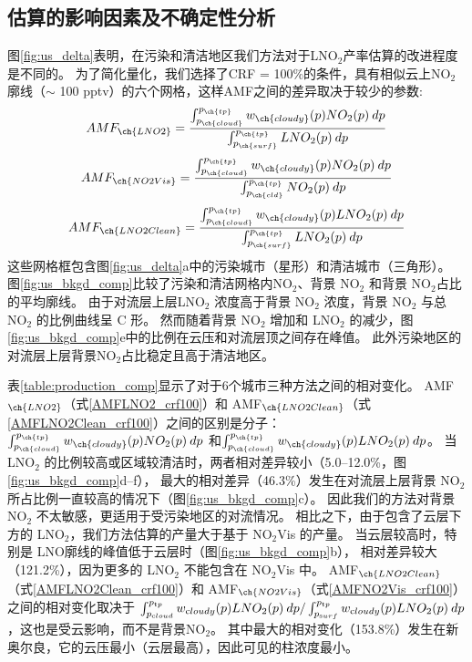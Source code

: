\subsection{估算的影响因素及不确定性分析} \label{sec:uncertainty}

图\ref{fig:us_delta}表明，在污染和清洁地区我们方法对于LNO$_2$产率估算的改进程度是不同的。
为了简化量化，我们选择了CRF = 100\%的条件，具有相似云上NO$_2$廓线（$\sim$ 100 pptv）的六个网格，这样AMF之间的差异取决于较少的参数:
\begin{equation} \label{AMFLNO2_crf100}
AMF_{\ch{LNO2}} = \frac{\int_{p_{\ch{cloud}}}^{p_{\ch{tp}}} w_{\ch{cloudy}}(p) NO_2(p) \: dp}{\int_{p_{\ch{surf}}}^{p_{\ch{tp}}} LNO_2(p) \: dp}
\end{equation}
\begin{equation} \label{AMFNO2Vis_crf100}
AMF_{\ch{NO2Vis}} = \frac{\int_{p_{\ch{cloud}}}^{p_{\ch{tp}}} w_{\ch{cloudy}}(p) NO_2(p) \: dp}{\int_{p_{\ch{cld}}}^{p_{\ch{tp}}} NO_2(p) \: dp}
\end{equation}
\begin{equation} \label{AMFLNO2Clean_crf100}
AMF_{\ch{LNO2Clean}} = \frac{\int_{p_{\ch{cloud}}}^{p_{\ch{tp}}} w_{\ch{cloudy}}(p) LNO_2(p) \: dp}{\int_{p_{\ch{surf}}}^{p_{\ch{tp}}} LNO_2(p) \: dp}
\end{equation}
这些网格框包含图\ref{fig:us_delta}a中的污染城市（星形）和清洁城市（三角形）。
图\ref{fig:us_bkgd_comp}比较了污染和清洁网格内NO$_2$、背景 NO$_2$ 和背景 NO$_2$占比的平均廓线。
由于对流层上层LNO$_2$ 浓度高于背景 NO$_2$ 浓度，背景 NO$_2$ 与总 NO$_2$ 的比例曲线呈 C 形。
然而随着背景 NO$_2$ 增加和 LNO$_2$ 的减少，图\ref{fig:us_bkgd_comp}e中的比例在云压和对流层顶之间存在峰值。
此外污染地区的对流层上层背景NO$_2$占比稳定且高于清洁地区。

表\ref{table:production_comp}显示了对于6个城市三种方法之间的相对变化。
AMF$_{\ch{LNO2}}$（式\ref{AMFLNO2_crf100}）和 AMF$_{\ch{LNO2Clean}}$（式\ref{AMFLNO2Clean_crf100}）之间的区别是分子：
$\int_{p_{\ch{cloud}}}^{p_{\ch{tp}}} w_{\ch{cloudy}}(p) NO_2(p) \: dp$
和$\int_{p_{\ch{cloud}}}^{p_{\ch{tp}}} w_{\ch{cloudy}}(p) LNO_2(p) \: dp$。
当 LNO$_2$ 的比例较高或区域较清洁时，两者相对差异较小（5.0--12.0\%，图\ref{fig:us_bkgd_comp}d--f），
最大的相对差异（46.3\%）发生在对流层上层背景 NO$_2$ 所占比例一直较高的情况下（图\ref{fig:us_bkgd_comp}c）。
因此我们的方法对背景 NO$_2$ 不太敏感，更适用于受污染地区的对流情况。
相比之下，由于包含了云层下方的 LNO$_2$，我们方法估算的产量大于基于 NO$_2$Vis 的产量。
当云层较高时，特别是 LNO廓线的峰值低于云层时（图\ref{fig:us_bkgd_comp}b），
相对差异较大（121.2\%），因为更多的 LNO$_2$ 不能包含在 NO$_2$Vis 中。
AMF$_{\ch{LNO2Clean}}$（式\ref{AMFLNO2Clean_crf100}）和 AMF$_{\ch{NO2Vis}}$（式\ref{AMFNO2Vis_crf100}）之间的相对变化取决于
$\int_{p_{\textrm cloud}}^{p_{\textrm tp}} w_{\textrm cloudy}(p) LNO_2(p) \: dp / \int_{p_{\textrm surf}}^{p_{\textrm tp}} w_{\textrm cloudy}(p) LNO_2(p) \: dp$，这也是受云影响，而不是背景NO$_2$。
其中最大的相对变化（153.8\%）发生在新奥尔良，它的云压最小（云层最高），因此可见的柱浓度最小。

